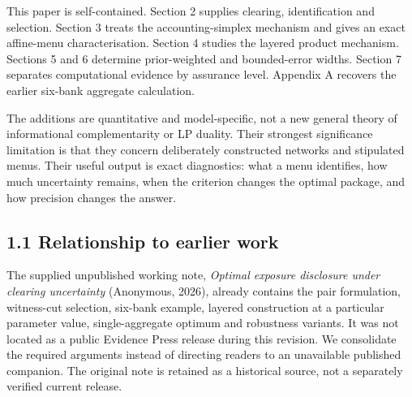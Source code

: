 \documentclass[
  british,
  11pt,
  a4paper,
]{article}
\begin{document}
This paper is self-contained. Section 2 supplies clearing,
identification and selection. Section 3 treats the accounting-simplex
mechanism and gives an exact affine-menu characterisation. Section 4
studies the layered product mechanism. Sections 5 and 6 determine
prior-weighted and bounded-error widths. Section 7 separates
computational evidence by assurance level. Appendix A recovers the
earlier six-bank aggregate calculation.

The additions are quantitative and model-specific, not a new general
theory of informational complementarity or LP duality. Their strongest
significance limitation is that they concern deliberately constructed
networks and stipulated menus. Their useful output is exact diagnostics:
what a menu identifies, how much uncertainty remains, when the criterion
changes the optimal package, and how precision changes the answer.

\subsection{1.1 Relationship to earlier
work}\label{relationship-to-earlier-work}

The supplied unpublished working note, \emph{Optimal exposure disclosure
under clearing uncertainty} (Anonymous, 2026), already contains the pair
formulation, witness-cut selection, six-bank example, layered
construction at a particular parameter value, single-aggregate optimum
and robustness variants. It was not located as a public Evidence Press
release during this revision. We consolidate the required arguments
instead of directing readers to an unavailable published companion. The
original note is retained as a historical source, not a separately
verified current release.
\end{document}
